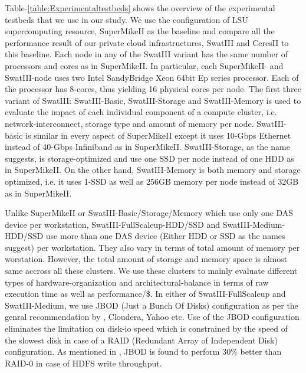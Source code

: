 \documentclass[conference]{IEEEtran}
\begin{document}
Table-\ref{table:Experimentaltestbeds} shows the overview of the experimental testbeds that we use in our study.
We use the configuration of LSU supercomputing resource, SuperMikeII as the baseline and compare all the performance result of our private cloud infrastructures, SwatIII and CeresII to this baseline.
Each node in any of the SwatIII variant has the same number of processors and cores as in SuperMikeII.
In particular, each SuperMikeII- and SwatIII-node uses two Intel SandyBridge Xeon 64bit Ep series processor. Each of the processor has 8-cores, thus yielding 16 physical cores per node.
The first three variant of SwatIII: SwatIII-Basic, SwatIII-Storage and SwatIII-Memory is used to evaluate the impact of each individual component of a compute cluster, i.e. network-interconnect, storage type and amount of memory per node.
SwatIII-basic is similar in every aspect of SuperMikeII except it uses 10-Gbps Ethernet instead of 40-Gbps Infiniband as in SuperMikeII.
SwatIII-Storage, as the name suggests, is storage-optimized and use one SSD per node instead of one HDD as in SuperMikeII.
On the other hand, SwatIII-Memory is both memory and storage optimized, i.e. it uses 1-SSD as well as 256GB memory per node instead of 32GB as in SuperMikeII.

Unlike SuperMikeII or SwatIII-Basic/Storage/Memory which use only one DAS device per workstation, SwatIII-FullScaleup-HDD/SSD and SwatIII-Medium-HDD/SSD use more than one DAS device (Either HDD or SSD as the names suggest) per workstation.
They also vary in terms of total amount of memory per worstation.
However, the total amount of storage and memory space is almost same accross all these clusters.
We use these clusters to mainly evaluate different types of hardware-organization and architectural-balance in terms of raw execution time as well as performance/\$.
In either of SwatIII-FullScaleup and SwatIII-Medium, we use JBOD (Just a Bunch Of Disks) configuration as per the genral recommendation by \cite{fw:hadoop}, Cloudera, Yahoo etc.
Use of the JBOD configuration eliminates the limitation on disk-io speed which is constrained by the speed of the slowest disk in case of a RAID (Redundant Array of Independent Disk) configuration.
As mentioned in \cite{fw:hadoop}, JBOD is found to perform 30\% better than RAID-0 in case of HDFS write throughput.
\end{document}
